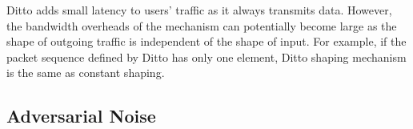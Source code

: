 Ditto adds small latency to users' traffic as it always transmits data.
However, the bandwidth overheads of the mechanism can potentially become large as the shape of outgoing traffic is independent of the shape of input.
For example, if the packet sequence defined by Ditto has only one element, Ditto shaping mechanism is the same as constant shaping.  
\subsection{Adversarial Noise}





